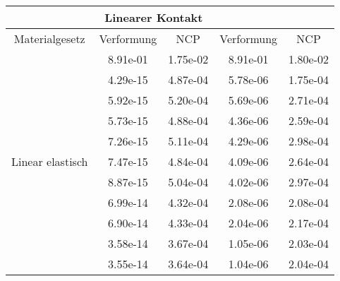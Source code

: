 \begin{table} 
\centering 
\begin{tabular}{c|cc|cc|} 
\cline{2-5} 
 & \multicolumn{2}{|c|}{Linearer Kontakt} &  \\ 
\hline 
\multicolumn{1}{|c|}{Materialgesetz} & \multicolumn{1}{c|}{Verformung} & \multicolumn{1}{c|}{NCP} & \multicolumn{1}{c|}{Verformung} & \multicolumn{1}{c|}{NCP} \\ 
\hline 
\multicolumn{1}{|c|}{\multirow{17}{*}{Linear elastisch}} &\multicolumn{1}{|c|}{  8.91e-01} & \multicolumn{1}{|c|}{  1.75e-02} & \multicolumn{1}{|c|}{  8.91e-01} & \multicolumn{1}{|c|}{  1.80e-02} \\ 
\multicolumn{1}{|c|}{} & \multicolumn{1}{|c|}{  4.29e-15} & \multicolumn{1}{|c|}{  4.87e-04} & \multicolumn{1}{|c|}{  5.78e-06} & \multicolumn{1}{|c|}{  1.75e-04} \\ 
\multicolumn{1}{|c|}{} & \multicolumn{1}{|c|}{  5.92e-15} & \multicolumn{1}{|c|}{  5.20e-04} & \multicolumn{1}{|c|}{  5.69e-06} & \multicolumn{1}{|c|}{  2.71e-04} \\ 
\multicolumn{1}{|c|}{} & \multicolumn{1}{|c|}{  5.73e-15} & \multicolumn{1}{|c|}{  4.88e-04} & \multicolumn{1}{|c|}{  4.36e-06} & \multicolumn{1}{|c|}{  2.59e-04} \\ 
\multicolumn{1}{|c|}{} & \multicolumn{1}{|c|}{  7.26e-15} & \multicolumn{1}{|c|}{  5.11e-04} & \multicolumn{1}{|c|}{  4.29e-06} & \multicolumn{1}{|c|}{  2.98e-04} \\ 
\multicolumn{1}{|c|}{} & \multicolumn{1}{|c|}{  7.47e-15} & \multicolumn{1}{|c|}{  4.84e-04} & \multicolumn{1}{|c|}{  4.09e-06} & \multicolumn{1}{|c|}{  2.64e-04} \\ 
\multicolumn{1}{|c|}{} & \multicolumn{1}{|c|}{  8.87e-15} & \multicolumn{1}{|c|}{  5.04e-04} & \multicolumn{1}{|c|}{  4.02e-06} & \multicolumn{1}{|c|}{  2.97e-04} \\ 
\multicolumn{1}{|c|}{} & \multicolumn{1}{|c|}{  6.99e-14} & \multicolumn{1}{|c|}{  4.32e-04} & \multicolumn{1}{|c|}{  2.08e-06} & \multicolumn{1}{|c|}{  2.08e-04} \\ 
\multicolumn{1}{|c|}{} & \multicolumn{1}{|c|}{  6.90e-14} & \multicolumn{1}{|c|}{  4.33e-04} & \multicolumn{1}{|c|}{  2.04e-06} & \multicolumn{1}{|c|}{  2.17e-04} \\ 
\multicolumn{1}{|c|}{} & \multicolumn{1}{|c|}{  3.58e-14} & \multicolumn{1}{|c|}{  3.67e-04} & \multicolumn{1}{|c|}{  1.05e-06} & \multicolumn{1}{|c|}{  2.03e-04} \\ 
\multicolumn{1}{|c|}{} & \multicolumn{1}{|c|}{  3.55e-14} & \multicolumn{1}{|c|}{  3.64e-04} & \multicolumn{1}{|c|}{  1.04e-06} & \multicolumn{1}{|c|}{  2.04e-04} \\ 

\end{tabular}
\end{table}
